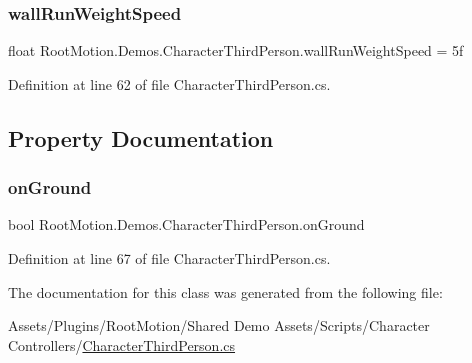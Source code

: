 \subsubsection{\texorpdfstring{wall\+Run\+Weight\+Speed}{wallRunWeightSpeed}}
{\footnotesize\ttfamily float Root\+Motion.\+Demos.\+Character\+Third\+Person.\+wall\+Run\+Weight\+Speed = 5f}



Definition at line 62 of file Character\+Third\+Person.\+cs.



\subsection{Property Documentation}
\mbox{\label{class_root_motion_1_1_demos_1_1_character_third_person_a99fa02afaf384e5e18f4b11c647327a0}} 
\subsubsection{\texorpdfstring{on\+Ground}{onGround}}
{\footnotesize\ttfamily bool Root\+Motion.\+Demos.\+Character\+Third\+Person.\+on\+Ground\hspace{0.3cm}{\ttfamily [get]}}



Definition at line 67 of file Character\+Third\+Person.\+cs.



The documentation for this class was generated from the following file\+:\begin{DoxyCompactItemize}
\item 
Assets/\+Plugins/\+Root\+Motion/\+Shared Demo Assets/\+Scripts/\+Character Controllers/\mbox{\hyperlink{_character_third_person_8cs}{Character\+Third\+Person.\+cs}}\end{DoxyCompactItemize}
